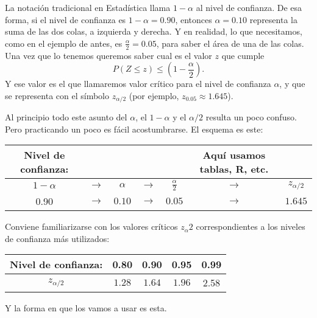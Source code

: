 \begin{itemize}
        La notación tradicional en Estadística llama $1-\alpha$ al nivel de confianza. De esa forma, si el nivel de confianza es $1-\alpha=0.90$, entonces $\alpha=0.10$ representa la suma de las dos colas, a izquierda y derecha. Y en realidad, lo que necesitamos, como en el ejemplo de antes, es $\frac{\alpha}{2}=0.05$, para saber el área de una de las colas. Una vez que lo tenemos queremos saber cual es el valor $z$ que cumple
        \[P(Z\leq z)\leq \left(1-\dfrac{\alpha}{2}\right).\]
        Y ese valor es el que llamaremos {\sf valor crítico} para el nivel de confianza $\alpha$, y que se representa con el símbolo $z_{\alpha/2}$ (por ejemplo, $z_{0.05}\approx 1.645$).

        Al principio todo este asunto del $\alpha$, el $1-\alpha$ y el $\alpha/2$ resulta un poco confuso. Pero practicando un poco es fácil acostumbrarse. El esquema es este:
        \begin{center}
        \begin{tabular}{|c|c|c|c|c|c|c|}
        \hline
        Nivel de confianza:&&&&&Aquí usamos tablas, R, etc.&\\
        \hline
        $1-\alpha$\rule{0cm}{1cm}&$\longrightarrow$&$\alpha$&$\longrightarrow$&$\frac{\alpha}{2}$&$\longrightarrow$&$z_{\alpha/2}$\\[3mm]
        \hline
        0.90\rule{0cm}{1cm}&$\longrightarrow$&$0.10$&$\longrightarrow$&$0.05$&$\longrightarrow$&$1.645$\\[3mm]
        \hline
        \end{tabular}
        \end{center}

        Conviene familiarizarse con los valores críticos $z_{\alpha}{2}$ correspondientes a los niveles de confianza más utilizados:

        \begin{center}\label{tabla:valoresCriticosNormalEstandar}
        \begin{tabular}{|c|c|c|c|c|}
        \hline
        {\bf Nivel de confianza:}\rule{0cm}{0.5cm}&0.80&0.90&0.95&0.99\\
        \hline
        $z_{\alpha/2}$\rule{0cm}{0.5cm}&$1.28$&$1.64$&$1.96$&2.58\\[3mm]
        \hline
        \end{tabular}
        \end{center}

        Y la forma en que los vamos a usar es esta.\\[3mm]
       \\[3mm]


       \end{itemize}

